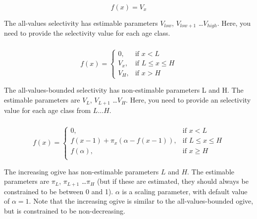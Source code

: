 \begin{equation}
f(x)=V_x
\end{equation}

The all-values selectivity has estimable parameters $V_{low}$, $V_{low+1}$ \ldots $V_{high}$. Here, you need to provide the selectivity value for each age class.

\subsubsection[All-values-bounded]{}

\begin{equation}
f(x)=\begin{cases}
		 0, & \text{if $x < L$} \\
		 V_x, & \text{if $L \le x \le H$} \\
		 V_H, & \text{if $x > H$}
  \end{cases}
\end{equation}

The all-values-bounded selectivity has non-estimable parameters L and H. The estimable parameters are $V_L$, $V_{L+1}$ \ldots $V_H$. Here, you need to provide an selectivity value for each age class from $L \ldots H$.

\subsubsection[Increasing]{}

\begin{equation} 
f(x)=\begin{cases}
	  0, & \text{if $x < L$} \\
	  f(x-1)+ \pi_x(\alpha-f(x-1)), & \text{if $L \le x \le H$} \\
	  f(\alpha), & \text{if $x \ge H$} \\  
  \end{cases}
\end{equation}

The increasing ogive has non-estimable parameters $L$ and $H$. The estimable parameters are $\pi_L$, $\pi_{L+1}$ \ldots $\pi_H$ (but if these are estimated, they should always be constrained to be between 0 and 1). $\alpha$ is a scaling parameter, with default value of $\alpha = 1$. Note that the increasing ogive is similar to the all-values-bounded ogive, but is constrained to be non-decreasing.

